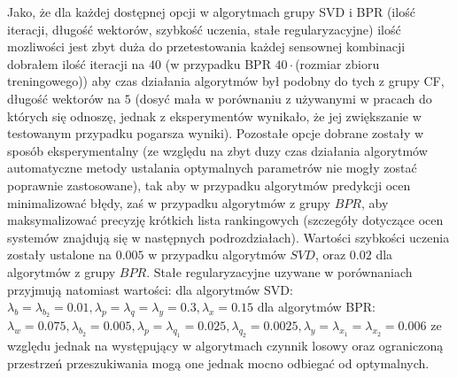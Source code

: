 \documentclass{pracamgr}
\begin{document}
   Jako, że dla każdej dostępnej opcji w algorytmach grupy SVD i BPR (ilość iteracji, długość wektorów, szybkość uczenia, stałe regularyzacyjne)
   ilość mozliwości jest zbyt duża do przetestowania każdej sensownej kombinacji dobrałem ilość iteracji na $40$
   (w przypadku BPR $40\cdot$(rozmiar zbioru treningowego)) aby czas działania algorytmów był podobny do tych z grupy CF, długość wektorów na $5$
   (dosyć mała w porównaniu z używanymi w pracach do których się odnoszę, jednak z eksperymentów wynikało, że jej zwiększanie w testowanym przypadku
   pogarsza wyniki). Pozostałe opcje dobrane zostały w sposób eksperymentalny
   (ze względu na zbyt duzy czas działania algorytmów automatyczne metody ustalania optymalnych parametrów nie mogły zostać poprawnie zastosowane),
   tak aby w przypadku algorytmów predykcji ocen minimalizować błędy, zaś w przypadku algorytmów z grupy $BPR$, aby maksymalizować precyzję
   krótkich lista rankingowych (szczegóły dotyczące ocen systemów znajdują się w następnych podrozdziałach).
   Wartości szybkości uczenia zostały ustalone na $0.005$ w przypadku algorytmów $SVD$, oraz $0.02$ dla algorytmów z grupy $BPR$.
   Stałe regularyzacyjne uzywane w porównaniach przyjmują natomiast wartości:\newline
   dla algorytmów SVD:\newline
   $\lambda_b=\lambda_{b_2}=0.01,\lambda_p=\lambda_q=\lambda_y=0.3,\lambda_x=0.15$\newline
   dla algorytmów BPR:\newline
   $\lambda_w=0.075,\lambda_{b_2}=0.005,\lambda_p=\lambda_{q_1}=0.025,\lambda_{q_2}=0.0025,\lambda_y=\lambda_{x_1}=\lambda_{x_2}=0.006$\newline
   ze względu jednak na występujący w algorytmach czynnik losowy oraz ograniczoną przestrzeń przeszukiwania mogą one jednak mocno odbiegać od optymalnych.\newline
   
\end{document}
